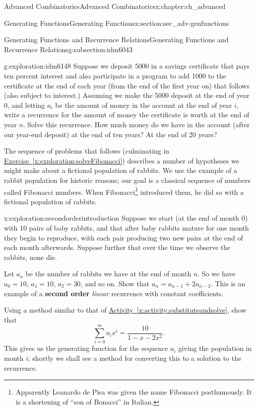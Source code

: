 \documentclass[oneside,10pt,]{book}
\newcommand{\terminology}[1]{\textbf{#1}}
\numberwithin{equation}{chapter}
\begin{document}
\begin{chapterptx}{Advanced Combinatorics}{}{Advanced Combinatorics}{}{}{x:chapter:ch_advanced}
\begin{sectionptx}{Generating Functions}{}{Generating Functions}{}{}{x:section:sec_adv-genfunctions}
\begin{subsectionptx}{Generating Functions and Recurrence Relations}{}{Generating Functions and Recurrence Relations}{}{}{g:subsection:idm6043}
\begin{exploration}{}{g:exploration:idm6148}
Suppose we deposit \textdollar{}5000 in a savings certificate that pays ten percent interest and also participate in a program to add \textdollar{}1000 to the certificate at the end of each year (from the end of the first year on) that follows (also subject to interest.) Assuming we make the \textdollar{}5000 deposit at the end of year 0, and letting \(a_i\) be the amount of money in the account at the end of year \(i\), write a recurrence for the amount of money the certificate is worth at the end of year \(n\). Solve this recurrence. How much money do we have in the account (after our year-end deposit) at the end of ten years?  At the end of 20 years?%
\end{exploration}
The sequence of problems that follows (culminating in \hyperref[x:exploration:solveFibonacci]{Exercise~\ref{x:exploration:solveFibonacci}}) describes a number of hypotheses we might make about a fictional population of rabbits. We use the example of a rabbit population for historic reasons; our goal is a classical sequence of numbers called Fibonacci numbers. When Fibonacci\footnote{Apparently Leanardo de Pisa was given the name Fibonacci posthumously. It is a shortening of ``son of Bonacci'' in Italian.\label{g:fn:idm6168}} introduced them, he did so with a fictional population of rabbits.%
\begin{exploration}{}{x:exploration:secondorderintroduction}%
Suppose we start (at the end of month 0) with 10 pairs of baby rabbits, and that after baby rabbits mature for one month they begin to reproduce, with each pair producing two new pairs at the end of each month afterwards. Suppose further that over the time we observe the rabbits, none die.%
\par
Let \(a_n\) be the number of rabbits we have at the end of month \(n\). So we have \(a_0 = 10\), \(a_1 = 10\), \(a_2 = 30\), and so on.  Show that \(a_n=a_{n-1} + 2a_{n-2}\). This is an example of a \terminology{second order} \emph{linear} recurrence with constant coefficients.%
\par
Using a method similar to that of \hyperref[x:activity:substituteandsolve]{Activity~\ref{x:activity:substituteandsolve}}, show that%
\begin{equation*}
\sum_{i=0}^\infty a_ix^i = \frac{10}{1-x-2x^2}.
\end{equation*}
This gives us the generating function for the sequence \(a_i\) giving the population in month \(i\); shortly we shall see a method for converting this to a solution to the recurrence.%

\end{exploration}
\end{subsectionptx}
\end{sectionptx}
\end{chapterptx}
\end{document}
